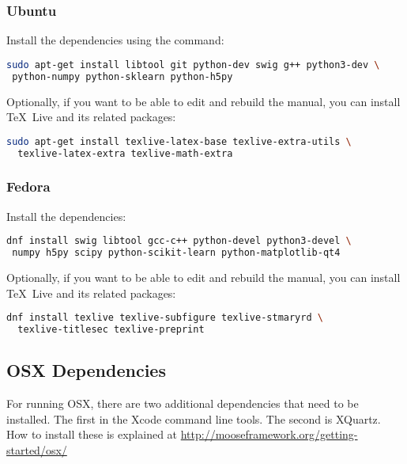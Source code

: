 \subsubsection{Ubuntu}

Install the dependencies using the command:

\begin{lstlisting}[language=bash]
sudo apt-get install libtool git python-dev swig g++ python3-dev \
 python-numpy python-sklearn python-h5py
\end{lstlisting}


Optionally, if you want to be able to edit and rebuild the manual, you can
install \TeX~Live and its related packages:
\begin{lstlisting}[language=bash]
sudo apt-get install texlive-latex-base texlive-extra-utils \
  texlive-latex-extra texlive-math-extra
\end{lstlisting}

\goToRavenInstallation

\subsubsection{Fedora}

Install the dependencies:

\begin{lstlisting}[language=bash]
dnf install swig libtool gcc-c++ python-devel python3-devel \
 numpy h5py scipy python-scikit-learn python-matplotlib-qt4
\end{lstlisting}

Optionally, if you want to be able to edit and rebuild the manual, you can
install \TeX~Live and its related packages:
\begin{lstlisting}[language=bash]
dnf install texlive texlive-subfigure texlive-stmaryrd \
  texlive-titlesec texlive-preprint
\end{lstlisting}

\goToRavenInstallation

\subsection{OSX Dependencies}
\label{osx_dependencies}

For running OSX, there are two additional dependencies that need to be
installed.  The first in the Xcode command line tools.  The second is
XQuartz.  How to install these is explained at
\url{http://mooseframework.org/getting-started/osx/}

